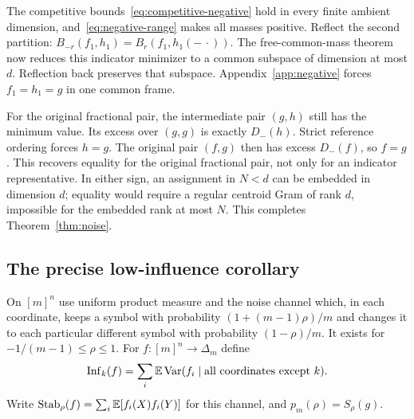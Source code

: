 The competitive bounds~\eqref{eq:competitive-negative} hold in every finite
ambient dimension, and~\eqref{eq:negative-range} makes all masses positive.
Reflect the second partition: $B_{-r}(f_1,h_1)=B_r(f_1,h_1(-\,\cdot))$.
The free-common-mass theorem \cite[Theorem 7.9]{H2022} now reduces this
indicator minimizer to a common subspace of dimension at most $d$.
Reflection back preserves that subspace. Appendix~\ref{app:negative} forces
$f_1=h_1=g$ in one common frame.

For the original fractional pair, the intermediate pair $(g,h)$ still has
the minimum value. Its excess over $(g,g)$ is exactly $D_-(h)$.
Strict reference ordering forces $h=g$. The original pair $(f,g)$ then
has excess $D_-(f)$, so $f=g$. This recovers equality for the original
fractional pair, not only for an indicator representative.
In either sign, an assignment in $N<d$ can be embedded in dimension $d$;
equality would require a regular centroid Gram of rank $d$, impossible for
the embedded rank at most $N$. This completes Theorem~\ref{thm:noise}.

\subsection{The precise low-influence corollary}
On $[m]^n$ use uniform product measure and the noise channel which, in each
coordinate, keeps a symbol with probability
$(1+(m-1)\rho)/m$ and changes it to each particular different symbol with
probability $(1-\rho)/m$. It exists for $-1/(m-1)\leq\rho\leq1$.
For $f:[m]^n\to\Delta_m$ define
\[
 \operatorname{Inf}_k(f)=\sum_i\mathbb E\operatorname{Var}(f_i\mid\hbox{all coordinates except }k).
\]
Write $\operatorname{Stab}_\rho(f)=\sum_i\mathbb E[f_i(X)f_i(Y)]$ for this channel,
and $p_m(\rho)=S_\rho(g)$.

